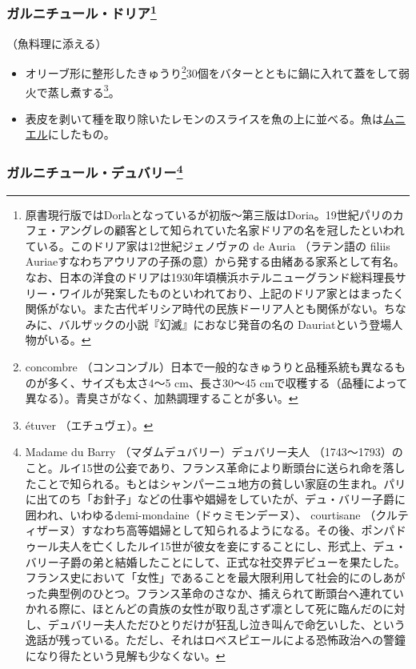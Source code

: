 \begin{recette}
\hypertarget{garniture-doria}{%
\subsubsection[ガルニチュール・ドリア]{\texorpdfstring{ガルニチュール・ドリア\footnote{原書現行版ではDorlaとなっているが初版〜第三版はDoria。19世紀パリのカフェ・アングレの顧客として知られていた名家ドリアの名を冠したといわれている。このドリア家は12世紀ジェノヴァの
  de Auria （ラテン語の filiis
  Auriaeすなわちアウリアの子孫の意）から発する由緒ある家系として有名。なお、日本の洋食のドリアは1930年頃横浜ホテルニューグランド総料理長サリー・ワイルが発案したものといわれており、上記のドリア家とはまったく関係がない。また古代ギリシア時代の民族ドーリア人とも関係がない。ちなみに、バルザックの小説『幻滅』におなじ発音の名の
  Dauriatという登場人物がいる。}}{ガルニチュール・ドリア}}\label{garniture-doria}}



（魚料理に添える）

\begin{itemize}
\item
  オリーブ形に整形したきゅうり\footnote{concombre
    （コンコンブル）日本で一般的なきゅうりと品種系統も異なるものが多く、サイズも太さ4〜5
    cm、長さ30〜45
    cmで収穫する（品種によって異なる）。青臭さがなく、加熱調理することが多い。}30個をバターとともに鍋に入れて蓋をして弱火で蒸し煮する\footnote{étuver
    （エチュヴェ）。}。
\item
  表皮を剥いて種を取り除いたレモンのスライスを魚の上に並べる。魚は\protect\hyperlink{meuniere}{ムニエル}にしたもの。
\end{itemize}

\hypertarget{garniture-dubarry}{%
\subsubsection[ガルニチュール・デュバリー]{\texorpdfstring{ガルニチュール・デュバリー\footnote{Madame
  du Barry （マダムデュバリー）デュバリー夫人
  （1743〜1793）のこと。ルイ15世の公妾であり、フランス革命により断頭台に送られ命を落したことで知られる。もとはシャンパーニュ地方の貧しい家庭の生まれ。パリに出てのち「お針子」などの仕事や娼婦をしていたが、デュ・バリー子爵に囲われ、いわゆるdemi-mondaine（ドゥミモンデーヌ）、
  courtisane
  （クルティザーヌ）すなわち高等娼婦として知られるようになる。その後、ポンパドゥール夫人を亡くしたルイ15世が彼女を妾にすることにし、形式上、デュ・バリー子爵の弟と結婚したことにして、正式な社交界デビューを果たした。フランス史において「女性」であることを最大限利用して社会的にのしあがった典型例のひとつ。フランス革命のさなか、捕えられて断頭台へ連れていかれる際に、ほとんどの貴族の女性が取り乱さず凛として死に臨んだのに対し、デュバリー夫人ただひとりだけが狂乱し泣き叫んで命乞いした、という逸話が残っている。ただし、それはロベスピエールによる恐怖政治への警鐘になり得たという見解も少なくない。}}{ガルニチュール・デュバリー}}\label{garniture-dubarry}}


\end{recette}
